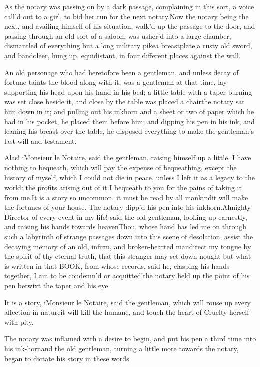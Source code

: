 \documentclass[twoside]{article}
\begin{document}
As the notary was passing on by a dark
passage, complaining in this sort, a voice
call’d out to a girl, to bid her run for
the next notary.\tskk Now the notary being
the next, and availing himself of his
situation, walk’d up the passage to the
door, and passing through an old sort of a
saloon, was usher’d into a large chamber,
dismantled of everything but a long
military pike\tskk a breastplate,\tskk a
rusty old sword, and bandoleer, hung up,
equidistant, in four different places
against the wall.

An old personage who had heretofore been a
gentleman, and unless decay of fortune
taints the blood along with it, was a
gentleman at that time, lay supporting his
head upon his hand in his bed; a little
table with a taper burning was set close
beside it, and close by the table was
placed a chair\tskk the notary sat him
down in it; and pulling out his inkhorn
and a sheet or two of paper which he had
in his pocket, he placed them before him;
and dipping his pen in his ink, and
leaning his breast over the table, he
disposed everything to make the
gentleman’s last will and testament.

Alas!  \i{Monsieur le Notaire}, said the
gentleman, raising himself up a little, I
have nothing to bequeath, which will pay
the expense of bequeathing, except the
history of myself, which I could not die
in peace, unless I left it as a legacy to
the world: the profits arising out of it I
bequeath to you for the pains of taking it
from me.\tskk It is a story so uncommon,
it must be read by all mankind\tskk it
will make the fortunes of your house.\tskk
The notary dipp’d his pen into his
inkhorn.\tskk Almighty Director of every
event in my life! said the old gentleman,
looking up earnestly, and raising his
hands towards heaven\tskk Thou, whose
hand has led me on through such a
labyrinth of strange passages down into
this scene of desolation, assist the
decaying memory of an old, infirm, and
broken-hearted man\tskk direct my tongue
by the spirit of thy eternal truth, that
this stranger may set down nought but what
is written in that BOOK, from whose
records, said he, clasping his hands
together, I am to be condemn’d or
acquitted!\tskk the notary held up the
point of his pen betwixt the taper and his
eye.\tskk 

It is a story, \i{Monsieur le Notaire},
said the gentleman, which will rouse up
every affection in nature\tskk it will
kill the humane, and touch the heart of
Cruelty herself with pity.\tskk 

\tskk The notary was inflamed with a
desire to begin, and put his pen a third
time into his ink-horn\tskk and the old
gentleman, turning a little more towards
the notary, began to dictate his story in
these words\tskk 
\end{document}
